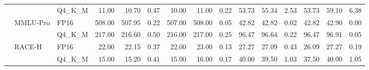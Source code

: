 \begin{table}[t]
{\begin{tabular}{lllrrrrrrrrrrrr}
 &  & Q4\_K\_M & 11.00 & 10.70 & 0.47 & 10.00 & 11.00 & 0.22 & 53.73 & 55.34 & 2.53 & 53.73 & 59.10 & 6.38 \\
 & MMLU-Pro & FP16 & 508.00 & 507.95 & 0.22 & 507.00 & 508.00 & 0.05 & 42.82 & 42.82 & 0.02 & 42.82 & 42.90 & 0.00 \\
 &  & Q4\_K\_M & 217.00 & 216.60 & 0.50 & 216.00 & 217.00 & 0.25 & 96.47 & 96.64 & 0.22 & 96.47 & 96.91 & 0.05 \\
 & RACE-H & FP16 & 22.00 & 22.15 & 0.37 & 22.00 & 23.00 & 0.13 & 27.27 & 27.09 & 0.43 & 26.09 & 27.27 & 0.19 \\
 &  & Q4\_K\_M & 15.00 & 15.20 & 0.41 & 15.00 & 16.00 & 0.17 & 40.00 & 39.50 & 1.03 & 37.50 & 40.00 & 1.05 \\
\bottomrule
\end{tabular}
}
\end{table}
